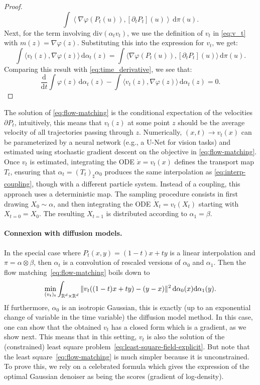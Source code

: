\begin{proof}
\begin{equation}
	\int \left\langle \nabla \varphi(P_t(u)), [\partial_t  P_t](u) \right\rangle \, \mathrm{d}\pi(u). \label{eq:time_derivative}
\end{equation}
Next, for the term involving \(\mathrm{div}(\alpha_t v_t)\), we use the definition of \(v_t\) in \eqref{eq:v_t} with \(m(z) = \nabla \varphi(z)\). Substituting this into the expression for \(v_t\), we get:
\[
	\int \langle v_t(z), \nabla \varphi(z) \rangle \, \mathrm{d}\alpha_t(z) = 
	\int \langle \nabla \varphi(P_t(u)), [\partial_t  P_t](u)  \rangle \, \mathrm{d} \pi(u).
\]
Comparing this result with \eqref{eq:time_derivative}, we see that:
\[
	\frac{\mathrm{d}}{\mathrm{d}t} \int \varphi(z) \, \mathrm{d}\alpha_t(z) - \int \langle v_t(z), \nabla \varphi(z) \rangle \, \mathrm{d}\alpha_t(z) = 0.
\]
\end{proof}

The solution of \eqref{eq:flow-matching} is the conditional expectation of the velocities $\partial P_t$, 
intuitively, this means that $v_t(z)$ at some point $z$ should be the average velocity of all trajectories passing through $z$.
%
Numerically, $(x,t) \to v_t(x)$ can be parameterized by a neural network (e.g., a U-Net for vision tasks) and estimated using stochastic gradient descent on the objective in \eqref{eq:flow-matching}.
%
Once $v_t$ is estimated, integrating the ODE $\dot{x} = v_t(x)$ defines the transport map $T_t$, ensuring that $\alpha_t = (T_t)_\sharp \alpha_0$ produces the same interpolation as \eqref{eq:interp-coupling}, though with a different particle system. Instead of a coupling, this approach uses a deterministic map.
The sampling procedure consists in first drawing $X_0 \sim \alpha$, and then integrating the ODE $\dot{X}_t = v_t(X_t)$ starting with $X_{t=0} = X_0$. 
The resulting $X_{t=1}$ is distributed according to $\alpha_1 = \beta$.

\paragraph{Connexion with diffusion models.}

In the special case where $P_t(x,y)=(1-t)x+ty$ is a linear interpolation and $\pi = \alpha \otimes \beta$, then $\alpha_t$ is a convolution of rescaled versions of $\alpha_0$ and $\alpha_1$. Then the flow matching~\eqref{eq:flow-matching} boils down to 
$$
    \min_{(v_t)_t} \int_{\mathbb{R}^{d} \times \mathbb{R}^d} \|v_t( (1-t)x+t y ) - (y-x) \|^2 \, \mathrm{d}\alpha_0(x) \mathrm{d}\alpha_1(y).
$$
If furthermore, $\alpha_0$ is an isotropic Gaussian, this is exactly (up to an exponential change of variable in the time variable) the diffusion model method. 
%
In this case, one can show that the obtained $v_t$ has a closed form which is a gradient, as we show next. 
%
This means that in this setting, $v_t$ is also the solution of the (constrained) least square problem~\eqref{eq:least-square-field-explicit}. But note that the least square~\eqref{eq:flow-matching} is much simpler because it is unconstrained. 
%
To prove this, we rely on a celebrated formula which gives the expression of the optimal Gaussian denoiser as being the scores (gradient of log-density).

